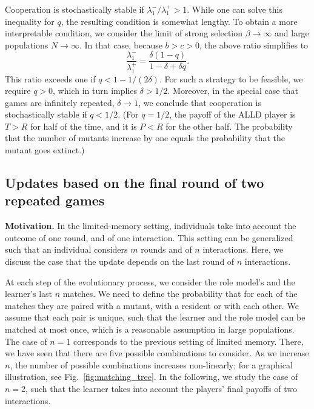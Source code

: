 \documentclass[11pt]{article}
\theoremstyle{plainCl1}
\theoremstyle{plainCl2}
\begin{document}
Cooperation is stochastically stable if $\lambda^-_1/\lambda^+_1\!>\!1$. 
While one can solve this inequality for $q$, the resulting condition is somewhat lengthy.  
To obtain a more interpretable condition, we consider the limit of strong selection \(\beta\! \rightarrow\! \infty\) and
large populations \(N \!\rightarrow \!\infty \). In that case, because $b\!>\!c\!>\!0$, the above ratio simplifies to
\begin{equation} \label{Eq:TransitionRatioSimple}
    \frac{\lambda^{-}_1}{\lambda^{+}_1} = \frac{\delta(1 - q)}{1 - \delta + \delta q}.
\end{equation}
This ratio exceeds one if  \(q <1 \!-\! 1/(2 \delta)\). 
For such a strategy to be feasible, we require $q\!>\!0$, which in turn implies $\delta\!>\!1/2$. 
Moreover, in the special case that games are infinitely repeated, \(\delta\! \rightarrow\! 1\), we conclude that cooperation is stochastically stable if  \(q \!<\! 1/2\). 
(For \(q\! =\! 1/2\), the payoff of the ALLD player is
\(T \!>\! R\) for half of the time, and it is \(P\! < \! R\) for the other half. The
probability that the number of mutants increase by one equals the probability
that the mutant goes extinct.)



\subsection{Updates based on the final round of two repeated games} 
\label{section:m_one_n_two}


{\bf Motivation.} 
In the limited-memory setting, individuals take into account the outcome of one round, and of one interaction. 
This setting can be generalized such that an individual
considers \(m\) rounds and of \(n\) interactions. Here, we discuss the case that
the update depends on the last round of \(n\) interactions.

At each step of the evolutionary process, we consider the role model's and the learner's last \(n\) matches. 
We need to define the probability that for each of
the matches they are paired with a mutant, with a resident or with each other.
We assume that each pair is unique, such that the learner and the role model
can be matched at most once, which is a reasonable assumption in large populations.
The case of \(n\!=\!1\) corresponds to the previous setting of limited memory. 
There, we have seen that there are five possible combinations to consider. 
As we increase $n$, the number of possible combinations increases non-linearly; 
for a graphical illustration, see Fig.~\ref{fig:matching_tree}. 
In the following, we study the case of \(n=2\), such that the learner takes into account the players' final payoffs of two interactions.\\
\end{document}
